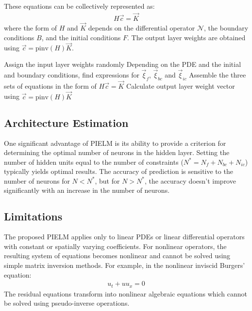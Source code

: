 \documentclass[11pt]{article}
\begin{document}
These equations can be collectively represented as:
\begin{align}
H\vec{c} = \vec{K}
\end{align}
where the form of $H$ and $\vec{K}$ depends on the differential operator $\mathcal{N}$, the boundary conditions $B$, and the initial conditions $F$. The output layer weights are obtained using $\vec{c} = \text{pinv}(H)\vec{K}$.

\begin{algorithm}
\caption{PIELM Algorithm}
\begin{algorithmic}[1]
\State Assign the input layer weights randomly
\State Depending on the PDE and the initial and boundary conditions, find expressions for $\vec{\xi}_f$, $\vec{\xi}_{bc}$ and $\vec{\xi}_{ic}$
\State Assemble the three sets of equations in the form of $H\vec{c} = \vec{K}$
\State Calculate output layer weight vector using $\vec{c} = \text{pinv}(H)\vec{K}$
\end{algorithmic}
\end{algorithm}

\subsection{Architecture Estimation}

One significant advantage of PIELM is its ability to provide a criterion for determining the optimal number of neurons in the hidden layer. Setting the number of hidden units equal to the number of constraints ($N^* = N_f + N_{bc} + N_{ic}$) typically yields optimal results. The accuracy of prediction is sensitive to the number of neurons for $N < N^*$, but for $N > N^*$, the accuracy doesn't improve significantly with an increase in the number of neurons.

\subsection{Limitations}

The proposed PIELM applies only to linear PDEs or linear differential operators with constant or spatially varying coefficients. For nonlinear operators, the resulting system of equations becomes nonlinear and cannot be solved using simple matrix inversion methods. For example, in the nonlinear inviscid Burgers' equation:
\begin{align}
u_t + uu_x = 0
\end{align}
The residual equations transform into nonlinear algebraic equations which cannot be solved using pseudo-inverse operations.
\end{document}

